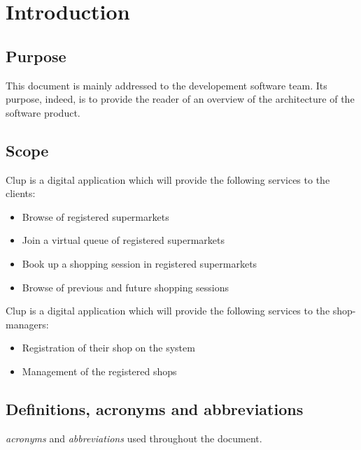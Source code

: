 \section{Introduction}
\label{sect:introduction}

\subsection{Purpose}
\label{subsect:purpose}
This document is mainly addressed to the developement software team. 
Its purpose, indeed, is to provide the reader of an overview of the architecture of the software product.

\subsection{Scope}
\label{subsect:scope}

Clup is a digital application which will provide the following services to the clients:
\begin{itemize}
    \item Browse of registered supermarkets
    \item Join a virtual queue of registered supermarkets 
    \item Book up a shopping session in registered supermarkets 
    \item Browse of previous and future shopping sessions 
\end{itemize}
Clup is a digital application which will provide the following services to the shop-managers:
\begin{itemize}
    \item Registration of their shop on the system
    \item Management of the registered shops
\end{itemize}


\subsection{Definitions, acronyms and abbreviations}
\label{subsect:definitionsacronymsabbreviations}

\textit{acronyms} and \textit{abbreviations} used throughout the document.

